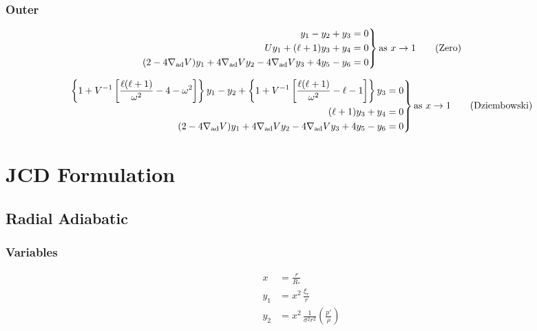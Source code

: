 \documentclass[fleqn]{article}
\newcommand{\nabad}{\ensuremath{\nabla_{\rm ad}}}
\newcommand{\Rstar}{\ensuremath{R_{\ast}}}
\begin{document}
\subsubsection*{Outer}

\begin{equation*}
\left.
\begin{aligned}
y_{1} - y_{2} + y_{3} &= 0 \\
U y_{1} + (\ell + 1) y_{3} + y_{4} &= 0 \\
(2 - 4\nabad V) y_{1} + 4 \nabad V y_{2} - 4 \nabad V y_{3} + 4 y_{5} - y_{6} &= 0
\end{aligned}
\right\}
\text{as}\ x \rightarrow 1 \qquad \text{(Zero)}
\end{equation*}

\begin{equation*}
\left.
\begin{aligned}
\left\{ 1 + V^{-1} \left[ \frac{\ell(\ell+1)}{\omega^{2}} - 4 - \omega^{2} \right] \right\} y_{1} -
y_{2} +
\left\{ 1 + V^{-1} \left[ \frac{\ell(\ell+1)}{\omega^{2}} - \ell - 1 \right] \right\} y_{3} &= 0 \\
(\ell + 1) y_{3} + y_{4} &= 0 \\
(2 - 4\nabad V) y_{1} + 4 \nabad V y_{2} - 4 \nabad V y_{3} + 4 y_{5} - y_{6} &= 0
\end{aligned}
\right\}
\text{as}\ x \rightarrow 1 \qquad \text{(Dziembowski)}
\end{equation*}


\newpage

\section*{JCD Formulation}

\subsection*{Radial Adiabatic}

\subsubsection*{Variables}

\begin{align*}
x     &= \frac{r}{\Rstar} \\
y_{1} &= x^{2}\, \frac{\xi_{r}}{r} \\
y_{2} &= x^{2}\, \frac{1}{\sigma^{2} r^{2}} \left( \frac{p'}{\rho} \right) \\
\end{align*}
\end{document}
